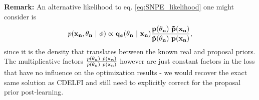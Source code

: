 \documentclass[10pt,english]{article}
\begin{document}
\begin{framed}
\noindent{}\textbf{Remark:} An alternative likelihood to eq. \ref{eq:SNPE_likelihood} one might consider is 
\begin{align}
p( \bf{x}_n, \theta_n \ | \ \phi) \propto q_\phi(\theta_n \ | \ \bf{x}_n) \frac{p(\theta_n) \ \tilde{p}(\bf{x}_n)}{\tilde{p}(\theta_n) \ p(\bf{x}_n)},
\end{align}
since it is the density that translates between the known real and proposal priors. 
The multiplicative factors $\frac{p(\theta_n) \ \tilde{p}(\bf{x}_n)}{\tilde{p}(\theta_n) \ p(\bf{x}_n)}$ however are just constant factors in the loss that have no influence on the optimization results - we would recover the exact same solution as CDELFI and still need to explicitly correct for the proposal prior post-learning. 
\end{framed}
\end{document}
